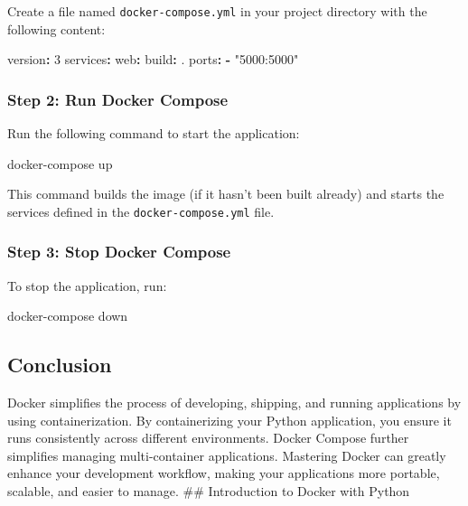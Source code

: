 \documentclass[
  letterpaper,
  DIV=11,
  numbers=noendperiod]{scrreprt}
\newenvironment{Shaded}{\begin{snugshade}}{\end{snugshade}}
\newcommand{\AttributeTok}[1]{\textcolor[rgb]{0.40,0.45,0.13}{#1}}
\newcommand{\ExtensionTok}[1]{\textcolor[rgb]{0.00,0.23,0.31}{#1}}
\newcommand{\FunctionTok}[1]{\textcolor[rgb]{0.28,0.35,0.67}{#1}}
\newcommand{\KeywordTok}[1]{\textcolor[rgb]{0.00,0.23,0.31}{\textbf{#1}}}
\newcommand{\NormalTok}[1]{\textcolor[rgb]{0.00,0.23,0.31}{#1}}
\newcommand{\StringTok}[1]{\textcolor[rgb]{0.13,0.47,0.30}{#1}}
\begin{document}
Create a file named \texttt{docker-compose.yml} in your project
directory with the following content:

\begin{Shaded}
\begin{Highlighting}[]
\FunctionTok{version}\KeywordTok{:}\AttributeTok{ }\StringTok{\textquotesingle{}3\textquotesingle{}}
\FunctionTok{services}\KeywordTok{:}
\AttributeTok{  }\FunctionTok{web}\KeywordTok{:}
\AttributeTok{    }\FunctionTok{build}\KeywordTok{:}\AttributeTok{ .}
\AttributeTok{    }\FunctionTok{ports}\KeywordTok{:}
\AttributeTok{      }\KeywordTok{{-}}\AttributeTok{ }\StringTok{"5000:5000"}
\end{Highlighting}
\end{Shaded}

\subsubsection{Step 2: Run Docker
Compose}\label{step-2-run-docker-compose}

Run the following command to start the application:

\begin{Shaded}
\begin{Highlighting}[]
\ExtensionTok{docker{-}compose}\NormalTok{ up}
\end{Highlighting}
\end{Shaded}

This command builds the image (if it hasn't been built already) and
starts the services defined in the \texttt{docker-compose.yml} file.

\subsubsection{Step 3: Stop Docker
Compose}\label{step-3-stop-docker-compose}

To stop the application, run:

\begin{Shaded}
\begin{Highlighting}[]
\ExtensionTok{docker{-}compose}\NormalTok{ down}
\end{Highlighting}
\end{Shaded}

\subsection{Conclusion}\label{conclusion-48}

Docker simplifies the process of developing, shipping, and running
applications by using containerization. By containerizing your Python
application, you ensure it runs consistently across different
environments. Docker Compose further simplifies managing multi-container
applications. Mastering Docker can greatly enhance your development
workflow, making your applications more portable, scalable, and easier
to manage. \#\# Introduction to Docker with Python
\end{document}
